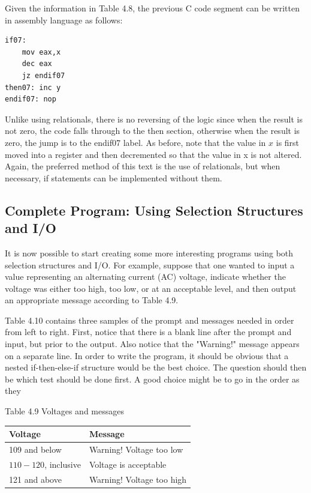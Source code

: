 \documentclass[10pt]{book}
\begin{document}
Given the information in Table 4.8, the previous C code segment can be written in assembly language as follows:

\begin{verbatim}
if07:
    mov eax,x
    dec eax
    jz endif07
then07: inc y
endif07: nop
\end{verbatim}

Unlike using relationals, there is no reversing of the logic since when the result is not zero, the code falls through to the then section, otherwise when the result is zero, the jump is to the endif07 label. As before, note that the value in $x$ is first moved into a register and then decremented so that the value in x is not altered. Again, the preferred method of this text is the use of relationals, but when necessary, if statements can be implemented without them.

\subsection{Complete Program: Using Selection Structures and I/O}
It is now possible to start creating some more interesting programs using both selection structures and I/O. For example, suppose that one wanted to input a value representing an alternating current (AC) voltage, indicate whether the voltage was either too high, too low, or at an acceptable level, and then output an appropriate message according to Table 4.9.

Table 4.10 contains three samples of the prompt and messages needed in order from left to right. First, notice that there is a blank line after the prompt and input, but prior to the output. Also notice that the "Warning!" message appears on a separate line. In order to write the program, it should be obvious that a nested if-then-else-if structure would be the best choice. The question should then be which test should be done first. A good choice might be to go in the order as they

Table 4.9 Voltages and messages

\begin{center}
\begin{tabular}{|l|l|}
\hline
Voltage & Message \\
\hline
109 and below & Warning! Voltage too low \\
\hline
$110-120$, inclusive & Voltage is acceptable \\
\hline
121 and above & Warning! Voltage too high \\
\hline
\end{tabular}
\end{center}
\end{document}
